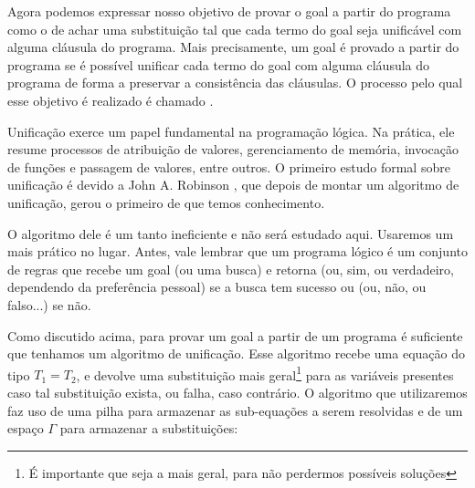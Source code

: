 \documentclass{article}
\begin{document}
Agora podemos expressar nosso objetivo de provar o goal a partir do programa como o de achar uma substituição tal que cada termo do goal seja unificável com alguma cláusula do programa. Mais precisamente, um goal é provado a partir do programa se é possível unificar cada termo do goal com alguma cláusula do programa de forma a preservar a consistência das cláusulas. O processo pelo qual esse objetivo é realizado é chamado .

Unificação exerce um papel fundamental na programação lógica. Na prática, ele resume processos de atribuição de valores, gerenciamento de memória, invocação de funções e passagem de valores, entre outros. O primeiro estudo formal sobre unificação é devido a John A. Robinson \cite{robinson}, que depois de montar um algoritmo de unificação, gerou o primeiro de que temos conhecimento.

O algoritmo dele é um tanto ineficiente e não será estudado aqui. Usaremos um mais prático no lugar. Antes, vale lembrar que um programa lógico é um conjunto de regras que recebe um goal (ou uma busca) e retorna  (ou, sim, ou verdadeiro, dependendo da preferência pessoal) se a busca tem sucesso ou  (ou, não, ou falso...) se não.

Como discutido acima, para provar um goal a partir de um programa é suficiente que tenhamos um algoritmo de unificação. Esse algoritmo recebe uma equação do tipo $T_1 = T_2$, e devolve uma substituição mais geral\footnote{É importante que seja a mais geral, para não perdermos possíveis soluções}
para as variáveis presentes caso tal substituição exista, ou falha, caso contrário. O algoritmo que utilizaremos faz uso de uma pilha para armazenar as sub-equações a serem resolvidas e de um espaço
$\Gamma$ para armazenar a substituições:
\end{document}
